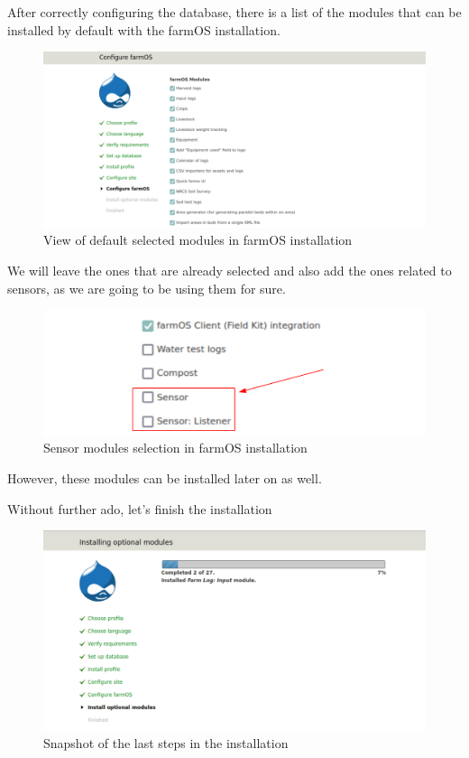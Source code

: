 After correctly configuring the database, there is a list of the modules that can be installed by default with the farmOS installation.

\begin{figure}[H]
    \centering
    \includegraphics[width=1\textwidth]{fig/drupal-install/farmos-modules.png}
    \caption{View of default selected modules in farmOS installation}
    \label{fig:farmos-modules}
\end{figure}

We will leave the ones that are already selected and also add the ones related to sensors, as we are going to be using them for sure.

\begin{figure}[H]
    \centering
    \includegraphics[width=1\textwidth]{fig/drupal-install/sensor-modules.png}
    \caption{Sensor modules selection in farmOS installation}
    \label{fig:sensor-modules}
\end{figure}

However, these modules can be installed later on as well.

Without further ado, let's finish the installation

\begin{figure}[H]
    \centering
    \includegraphics[width=1\textwidth]{fig/drupal-install/completing-install.png}
    \caption{Snapshot of the last steps in the installation}
    \label{fig:completing-install}
\end{figure}

